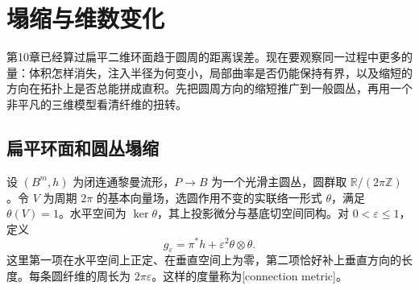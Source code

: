 
% 
% 

\section{塌缩与维数变化}
\label{g3:sec:2902}

第10章已经算过扁平二维环面趋于圆周的距离误差。现在要观察同一过程中更多的量：体积怎样消失，注入半径为何变小，局部曲率是否仍能保持有界，以及缩短的方向在拓扑上是否总能拼成直积。先把圆周方向的缩短推广到一般圆丛，再用一个非平凡的三维模型看清纤维的扭转。

\subsection{扁平环面和圆丛塌缩}
\label{g3:subsec:2902:01}
设 \((B^m,h)\) 为闭连通黎曼流形，\(P\to B\) 为一个光滑主圆丛，圆群取 \(\mathbb R/(2\pi\mathbb Z)\)。令 \(V\) 为周期 \(2\pi\) 的基本向量场，选圆作用不变的实联络一形式 \(\theta\)，满足 \(\theta(V)=1\)。水平空间为 \(\ker\theta\)，其上投影微分与基底切空间同构。对 \(0<\varepsilon\le1\)，定义
\begin{equation}\label{g3:eq:circle-bundle-collapsing-metric}
	g_\varepsilon=\pi^*h+\varepsilon^2\theta\otimes\theta.
\end{equation}
这里第一项在水平空间上正定、在垂直空间上为零，第二项恰好补上垂直方向的长度。每条圆纤维的周长为 \(2\pi\varepsilon\)。这样的度量称为[connection metric]。

